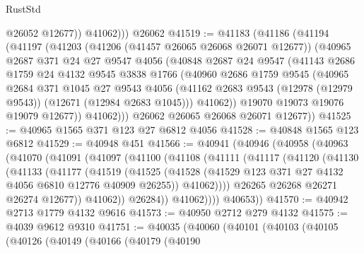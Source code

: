 \begin{lexlean}{RustStd}
\begin{coremodule}
              @26052
              @12677))
          @41062)))
    @26062
@41519 := @41183
    (@41186
      (@41194
        (@41197
          (@41203
            (@41206 (@41457 @26065 @26068 @26071 @12677))
            (@40965
              @2687
              @371
              @24
              @27
              @9547
              @4056
              (@40848
                @2687
                @24
                @9547
                (@41143
                  @2686
                  @1759
                  @24
                  @4132
                  @9545
                  @3838
                  @1766
                  (@40960
                    @2686
                    @1759
                    @9545
                    (@40965
                      @2684
                      @371
                      @1045
                      @27
                      @9543
                      @4056
                      (@41162 @2683 @9543 (@12978 (@12979 @9543)) (@12671 (@12984 @2683 @1045)))
                      @41062))
                  @19070
                  @19073
                  @19076
                  @19079
                  @12677))
              @41062)))
        @26062
        @26065
        @26068
        @26071
        @12677))
@41525 := @40965 @1565 @371 @123 @27 @6812 @4056
@41528 := @40848 @1565 @123 @6812
@41529 := @40948 @451
@41566 := @40941
    (@40946
      (@40958
        (@40963
          (@41070
            (@41091
              (@41097
                (@41100
                  (@41108
                    (@41111
                      (@41117
                        (@41120
                          (@41130
                            (@41133
                              (@41177
                                (@41519
                                  (@41525
                                    (@41528
                                      (@41529 @123 @371 @27 @4132 @4056 @6810 @12776 @40909 @26255))
                                    @41062))))
                            @26265
                            @26268
                            @26271
                            @26274
                            @12677))
                        @41062))
                    @26284))
                @41062))))
        @40653))
@41570 := @40942 @2713 @1779 @4132 @9616
@41573 := @40950 @2712 @279 @4132
@41575 := @4039 @9612 @9310
@41751 := @40035
    (@40060
      (@40101
        (@40103
          (@40105
            (@40126
              (@40149
                (@40166
                  (@40179
                    (@40190

\end{coremodule}
\end{lexlean}
